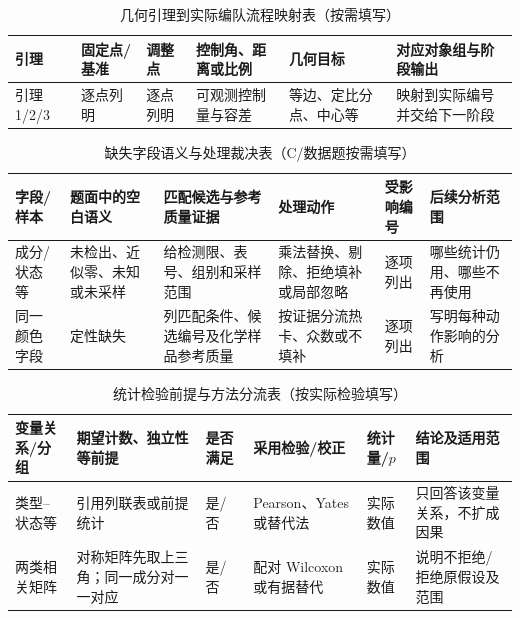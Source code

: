 \documentclass[withoutpreface,bwprint]{cumcmthesis}
\begin{document}
  \begin{table}[H]
    \centering
    \small
    \caption{几何引理到实际编队流程映射表（按需填写）}
    \label{tab:lemma-formation-assembly-guide}
    \begin{tabular}{p{1.35cm}p{2.0cm}p{2.0cm}p{2.5cm}p{2.4cm}p{2.7cm}}
      \toprule
      引理 & 固定点/基准 & 调整点 & 控制角、距离或比例 & 几何目标 & 对应对象组与阶段输出 \\
      \midrule
      引理 1/2/3 & 逐点列明 & 逐点列明 & 可观测控制量与容差 & 等边、定比分点、中心等 & 映射到实际编号并交给下一阶段 \\
      \bottomrule
    \end{tabular}
  \end{table}
  \begin{table}[H]
    \centering
    \small
    \caption{缺失字段语义与处理裁决表（C/数据题按需填写）}
    \label{tab:missing-semantics-guide}
    \begin{tabular}{p{1.7cm}p{2.0cm}p{2.4cm}p{2.35cm}p{2.15cm}p{2.35cm}}
      \toprule
      字段/样本 & 题面中的空白语义 & 匹配候选与参考质量证据 & 处理动作 & 受影响编号 & 后续分析范围 \\
      \midrule
      成分/状态等 & 未检出、近似零、未知或未采样 & 给检测限、表号、组别和采样范围 & 乘法替换、剔除、拒绝填补或局部忽略 & 逐项列出 & 哪些统计仍用、哪些不再使用 \\
      同一颜色字段 & 定性缺失 & 列匹配条件、候选编号及化学样品参考质量 & 按证据分流热卡、众数或不填补 & 逐项列出 & 写明每种动作影响的分析 \\
      \bottomrule
    \end{tabular}
  \end{table}
  \begin{table}[H]
    \centering
    \small
    \caption{统计检验前提与方法分流表（按实际检验填写）}
    \label{tab:test-prerequisite-routing-guide}
    \begin{tabular}{p{2.0cm}p{2.45cm}p{1.8cm}p{2.1cm}p{1.6cm}p{3.1cm}}
      \toprule
      变量关系/分组 & 期望计数、独立性等前提 & 是否满足 & 采用检验/校正 & 统计量/$p$ & 结论及适用范围 \\
      \midrule
      类型--状态等 & 引用列联表或前提统计 & 是/否 & Pearson、Yates 或替代法 & 实际数值 & 只回答该变量关系，不扩成因果 \\
      两类相关矩阵 & 对称矩阵先取上三角；同一成分对一一对应 & 是/否 & 配对 Wilcoxon 或有据替代 & 实际数值 & 说明不拒绝/拒绝原假设及范围 \\
      \bottomrule
    \end{tabular}
  \end{table}
\end{document}

